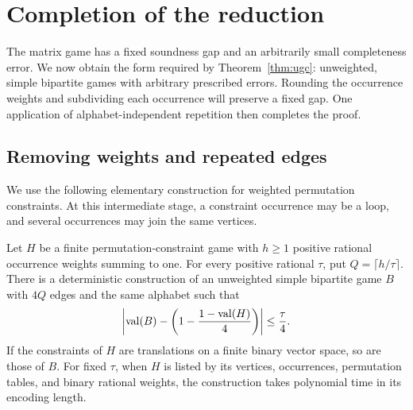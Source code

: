 \section{Completion of the reduction}
\label{sec:finish}

The matrix game has a fixed soundness gap and an arbitrarily small
completeness error.  We now obtain the form required by
Theorem~\ref{thm:ugc}: unweighted, simple bipartite games with arbitrary
prescribed errors.  Rounding the occurrence weights and subdividing
each occurrence will preserve a fixed gap.  One application of
alphabet-independent repetition then completes the proof.

\subsection{Removing weights and repeated edges}

We use the following elementary construction for weighted permutation
constraints.  At this intermediate stage, a constraint occurrence may
be a loop, and several occurrences may join the same vertices.

\begin{lemma}
\label{lem:unweighted-subdivision}
Let $H$ be a finite permutation-constraint game with $h\ge1$ positive
rational occurrence weights summing to one.  For every positive
rational $\tau$, put $Q=\lceil h/\tau\rceil$.  There is a
deterministic construction of an unweighted simple bipartite game $B$
with $4Q$ edges and the same alphabet such that
\begin{equation}
 \left|\operatorname{val}(B)-\left(1-\frac{1-\operatorname{val}(H)}4\right)\right|
 \le\frac{\tau}{4}.
 \label{eq:rounded-subdivision-value}
\end{equation}
If the constraints of $H$ are translations on a finite binary vector
space, so are those of $B$.  For fixed $\tau$, when $H$ is listed by its
vertices, occurrences, permutation tables, and binary rational weights,
the construction takes polynomial time in its encoding length.
\end{lemma}

